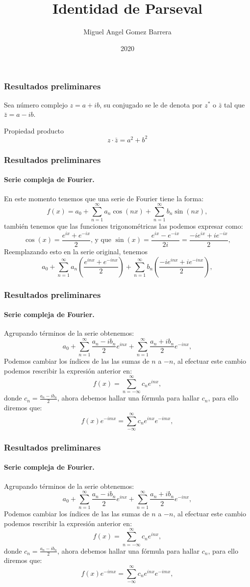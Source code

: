 \documentclass{beamer}
\title{Identidad de Parseval}
\author{Miguel Angel Gomez Barrera}
\institute{Fundación Universitaria Konrad Lorenz}
\date{2020}
\begin{document}
	\frame{\titlepage}
	\begin{frame}
	\frametitle{Resultados preliminares}
	Sea número complejo $z = a + ib$, su conjugado se le de denota por $z^*$ o $\bar{z}$ tal que  $\bar{z} = a - ib$. \pause
	\begin{block}{Propiedad producto}
		$$z \cdot \bar{z} = a^2 + b^2$$
	\end{block}
	\end{frame}
	\begin{frame}
		\frametitle{Resultados preliminares}
		\framesubtitle{Serie compleja de Fourier.}
		En este momento tenemos que una serie de Fourier tiene la forma:
		$$f(x) = a_0 + \sum_{n=1}^{\infty} a_n \cos(nx) + \sum_{n=1}^{\infty} b_n \sin(nx),$$
		\pause
		también tenemos que las funciones trigonométricas las podemos expresar como:
		$$\cos(x) = \frac{e^{ix} + e^{-ix}}{2} \text{, y que } \sin(x) = \frac{e^{ix} - e^{-ix}}{2i} = \frac{-ie^{ix} + ie^{-ix}}{2},$$
		\pause
		Reemplazando esto en la serie original, tenemos 
		$$ a_0 + \sum_{n=1}^{\infty} a_n \left( \frac{e^{inx} + e^{-inx}}{2} \right) + \sum_{n=1}^{\infty} b_n \left(\frac{-ie^{inx} + ie^{-inx}}{2}\right),$$
	\end{frame}
	\begin{frame}
	\frametitle{Resultados preliminares}
	\framesubtitle{Serie compleja de Fourier.}
	Agrupando términos de la serie obtenemos:
	$$a_0 + \sum_{n=1}^{\infty} \frac{a_n - ib_n}{2} e^{inx} + \sum_{n=1}^{\infty} \frac{a_n + ib_n}{2} e^{-inx},$$
	Podemos cambiar los índices de las las sumas de $n$ a $-n$, al efectuar este cambio podemos rescribir la expresión anterior en:
	$$ f(x) = \sum_{n = -\infty}^{\infty} c_n e^{inx},$$
	donde $c_n = \frac{a_n - ib_n}{2}$, ahora debemos hallar una fórmula para hallar $c_n$, para ello diremos que:
	$$f(x)e^{-imx} = \sum_{-\infty}^{\infty} c_n e^{inx} e^{-imx},$$
	\end{frame}
	\begin{frame}
	\frametitle{Resultados preliminares}
	\framesubtitle{Serie compleja de Fourier.}
	Agrupando términos de la serie obtenemos:
	$$a_0 + \sum_{n=1}^{\infty} \frac{a_n - ib_n}{2} e^{inx} + \sum_{n=1}^{\infty} \frac{a_n + ib_n}{2} e^{-inx},$$
	Podemos cambiar los índices de las las sumas de $n$ a $-n$, al efectuar este cambio podemos rescribir la expresión anterior en:
	$$ f(x) = \sum_{n = -\infty}^{\infty} c_n e^{inx},$$
	donde $c_n = \frac{a_n - ib_n}{2}$, ahora debemos hallar una fórmula para hallar $c_n$, para ello diremos que:
	$$f(x)e^{-imx} = \sum_{-\infty}^{\infty} c_n e^{inx} e^{-imx},$$
	\end{frame}
\end{document}
